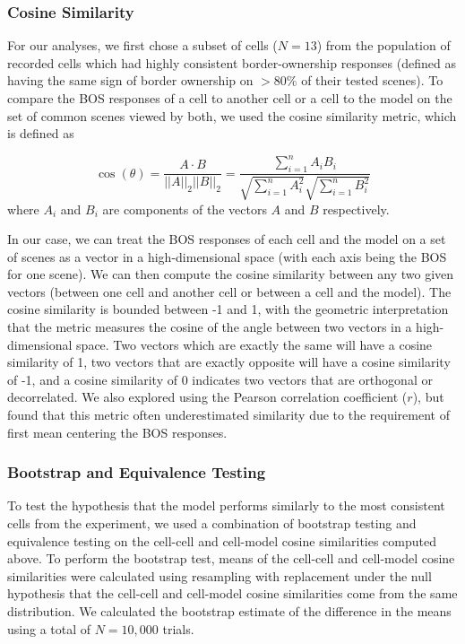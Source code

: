 \subsubsection{Cosine Similarity}
\label{sec:cos-sim-methods}
For our analyses, we first chose a subset of cells ($N=13$) from the population of recorded cells which had highly consistent border-ownership responses (defined as having the same sign of border ownership on $>$80\% of their tested scenes). To compare the BOS responses of a cell to another cell or a cell to the model on the set of common scenes viewed by both, we used the cosine similarity metric, which is defined as

\begin{equation}
\cos(\theta) = \frac{A \cdot B}{||A||_{2}||B||_{2}} = \frac{\sum\limits_{i=1}^{n}A_{i}B_{i}}{\sqrt{\sum\limits_{i=1}^{n}A_{i}^2}\sqrt{\sum\limits_{i=1}^{n}B_{i}^2}}
\label{eq:cos_sim}
\end{equation}
where $A_i$ and $B_i$ are components of the vectors $A$ and $B$ respectively.

In our case, we can treat the BOS responses of each cell and the model on a set of scenes as a vector in a high-dimensional space (with each axis being the BOS for one scene). We can then compute the cosine similarity between any two given vectors (\eg between one cell and another cell or between a cell and the model). The cosine similarity is bounded between -1 and 1, with the geometric interpretation that the metric measures the cosine of the angle between two vectors in a high-dimensional space. Two vectors which are exactly the same will have a cosine similarity of 1, two vectors that are exactly opposite will have a cosine similarity of -1, and a cosine similarity of 0 indicates two vectors that are orthogonal or decorrelated. We also explored using the Pearson correlation coefficient ($r$), but found that this metric often underestimated similarity due to the requirement of first mean centering the BOS responses.

\subsubsection{Bootstrap and Equivalence Testing}
\label{sec:equivalence_test}
To test the hypothesis that the model performs similarly to the most consistent cells from the experiment, we used a combination of bootstrap testing and equivalence testing on the cell-cell and cell-model cosine similarities computed above. To perform the bootstrap test, means of the cell-cell and cell-model cosine similarities were calculated using resampling with replacement under the null hypothesis that the cell-cell and cell-model cosine similarities come from the same distribution. We calculated the bootstrap estimate of the difference in the means using a total of $N = 10,000$ trials.


